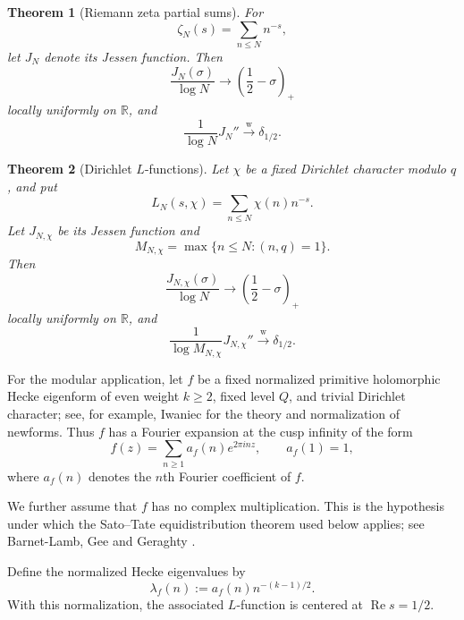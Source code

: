\documentclass[11pt]{article}
\newtheorem{theorem}{Theorem}[section]
\theoremstyle{definition}
\newcommand{\R}{\mathbb R}
\newcommand{\Ree}{\operatorname{Re}}
\newcommand{\1}{\mathbf 1}
\begin{document}
\begin{theorem}[Riemann zeta partial sums]\label{thm:zeta-intro}
For
\[
\zeta_N(s)=\sum_{n\le N}n^{-s},
\]
let $J_N$ denote its Jessen function.  Then
\begin{equation}\label{eq:zeta-potential-intro}
\frac{J_N(\sigma)}{\log N}
\longrightarrow
\left(\frac12-\sigma\right)_+
\end{equation}
locally uniformly on $\R$, and
\begin{equation}\label{eq:zeta-measure-intro}
\frac1{\log N}J_N''\xrightarrow{\mathrm w}\delta_{1/2}.
\end{equation}
\end{theorem}

\begin{theorem}[Dirichlet $L$-functions]\label{thm:dirichlet-intro}
Let $\chi$ be a fixed Dirichlet character modulo $q$, and put
\[
L_N(s,\chi)=\sum_{n\le N}\chi(n)n^{-s}.
\]
Let $J_{N,\chi}$ be its Jessen function and
\[
M_{N,\chi}=\max\{n\le N:(n,q)=1\}.
\]
Then
\begin{equation}\label{eq:dir-potential-intro}
\frac{J_{N,\chi}(\sigma)}{\log N}
\longrightarrow
\left(\frac12-\sigma\right)_+
\end{equation}
locally uniformly on $\R$, and
\begin{equation}\label{eq:dir-measure-intro}
\frac1{\log M_{N,\chi}}J_{N,\chi}''
\xrightarrow{\mathrm w}\delta_{1/2}.
\end{equation}
\end{theorem}

For the modular application, let $f$ be a fixed normalized primitive
holomorphic Hecke eigenform of even weight $k\ge2$, fixed level $Q$,
and trivial Dirichlet character; see, for example,
Iwaniec \cite[Sections~6.6--6.8]{IwaniecTopics} for the theory and
normalization of newforms.  Thus $f$ has a Fourier expansion at the
cusp infinity of the form
\begin{equation}\label{eq:modular-fourier-intro}
f(z)=\sum_{n\ge1}a_f(n)e^{2\pi inz},
\qquad a_f(1)=1,
\end{equation}
where $a_f(n)$ denotes the $n$th Fourier coefficient of $f$.

We further assume that $f$ has no complex multiplication.  This is the
hypothesis under which the Sato--Tate equidistribution theorem used
below applies; see Barnet-Lamb, Gee and Geraghty
\cite[Corollary~7.1.7]{BLGG2011}.

Define the normalized Hecke eigenvalues by
\begin{equation}\label{eq:lambda-normalization-intro}
\lambda_f(n):=a_f(n)n^{-(k-1)/2}.
\end{equation}
With this normalization, the associated $L$-function is centered at
$\Ree s=1/2$.
\end{document}
